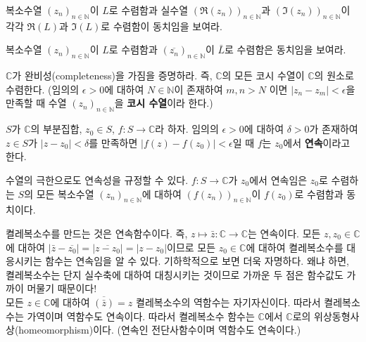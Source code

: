 \begin{salt_exercise} \label{ex-1-25}
복소수열 $(z_n)_{n\in\mathbb N}$이 $L$로 수렴함과
실수열 $(\Re(z_n))_{n\in\mathbb N}$과  $(\Im(z_n))_{n\in\mathbb N}$이
각각 $\Re(L)$과 $\Im(L)$로 수렴함이 동치임을 보여라.
\end{salt_exercise}

\begin{salt_exercise} \label{ex-1-26}
복소수열 $(z_n)_{n\in\mathbb N}$이 $L$로 수렴함과
$(\overline{z_n})_{n\in\mathbb N}$이 $\bar L$로 수렴함은 동치임을 보여라.
\end{salt_exercise}

\begin{salt_exercise} \label{ex-1-27}
$\mathbb C$가 완비성(completeness)을 가짐을 증명하라.
즉, $\mathbb C$의 모든 코시 수열이 $\mathbb C$의 원소로 수렴한다.
(임의의 $\epsilon>0$에 대하여  $N\in\mathbb N$이 존재하여
$m,n>N$ 이면 $|z_n - z_m| < \epsilon$을 만족할 때
수열 $(z_n)_{n\in\mathbb N}$을 {\bf 코시 수열}이라 한다.)
\end{salt_exercise}

$S$가 $\mathbb C$의 부분집합, $z_0\in S$,  $f:S\to \mathbb C$라 하자.
임의의 $\epsilon>0$에 대하여 $\delta>0$가 존재하여
$z\in S$가 $|z-z_0|<\delta$를 만족하면 $|f(z)-f(z_0)|<\epsilon$일 때
$f$는 $z_0$에서 {\bf 연속}이라고 한다.

수열의 극한으로도 연속성을 규정할 수 있다.
$f:S\to\mathbb C$가 $z_0$에서 연속임은
$z_0$로 수렴하는 $S$의 모든 복소수열 $(z_n)_{n\in\mathbb N}$에 대하여
$(f(z_n))_{n\in\mathbb N}$이 $f(z_0)$로 수렴함과 동치이다.

\begin{saltexample}[label=example-1-2] {}{}
켤레복소수를 만드는 것은 연속함수이다.
즉, $z\mapsto\bar z: \mathbb C \to \mathbb C$는 연속이다.
모든 $z, z_0 \in \mathbb C$에 대하여
$|\bar z - \overline{z_0}| = |\overline{z-z_0}| = |z-z_0|$이므로
모든 $z_0\in\mathbb C$에 대하여 켤레복소수를 대응시키는 함수는
연속임을 알 수 있다.
 기하학적으로 보면 더욱 자명하다. 왜냐 하면, 켤레복소수는 단지 실수축에 대하여 
대칭시키는 것이므로 가까운 두 점은 함수값도 가까이 머물기 때문이다! \\[1ex]
모든 $z\in\mathbb C$에 대하여 $\overline{(\bar z)} = z$ 켤레복소수의
역함수는 자기자신이다. 따라서 켤레복소수는 가역이며 역함수도 연속이다.
따라서 켤레복소수 함수는 $\mathbb C$에서 $\mathbb C$로의 
위상동형사상(homeomorphism)이다. (연속인 전단사함수이며 역함수도 연속이다.)
\end{saltexample}

